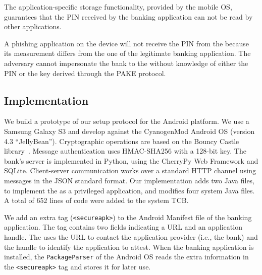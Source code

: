 The application-specific storage functionality, provided by the mobile OS, guarantees that the PIN received by the banking application can not be read by
other applications.

A phishing application on the device will not receive the PIN from the \secmodule{} because its measurement differs from the one of the legitimate banking application.
The adversary cannot impersonate the bank to the \secmodule{} without knowledge of either the PIN or the key derived through the PAKE protocol.

\subsection{Implementation}
\label{sec:setup:sp_phishing_implementation}

We build a prototype of our setup protocol for the Android platform.
We use a Samsung Galaxy S3 and develop against the CyanogenMod Android OS (version 4.3 ``JellyBean'').
Cryptographic operations are based on the Bouncy Castle library~\cite{bouncycastle}.
Message authentication uses HMAC-SHA256 with a 128-bit key.
The bank's server is implemented in Python, using the CherryPy Web Framework and SQLite.
Client-server communication works over a standard HTTP channel using messages in the JSON standard format.
Our implementation adds two Java files, to implement the \secmodule{} as a privileged application, and modifies four system Java files.
A total of 652 lines of code were added to the system TCB.

We add an extra tag (\texttt{<secureapk>}) to the Android Manifest file of the banking application.
The tag contains two fields indicating a URL and an application handle.
The \secmodule{} uses the URL to contact the application provider (i.e., the bank) and the handle to identify the application to attest.
When the banking application is installed, the \texttt{PackageParser} of the Android OS reads the extra information in the \texttt{<secureapk>} tag and stores it for later use.


